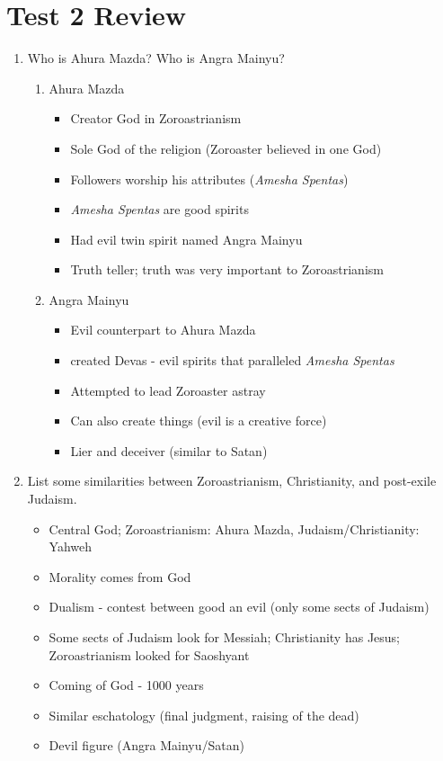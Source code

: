 \documentclass[8pt]{article}
\begin{document}
\section*{Test 2 Review}
\begin{enumerate}
    \item Who is Ahura Mazda? Who is Angra Mainyu?
    \begin{enumerate}
        \item Ahura Mazda
        \begin{itemize}
            \item Creator God in Zoroastrianism
            \item Sole God of the religion (Zoroaster believed in one God)
            \item Followers worship his attributes (\textit{Amesha Spentas})
            \item \textit{Amesha Spentas} are good spirits
            \item Had evil twin spirit named Angra Mainyu
            \item Truth teller; truth was very important to Zoroastrianism
        \end{itemize}
        \item Angra Mainyu
        \begin{itemize}
            \item Evil counterpart to Ahura Mazda
            \item created Devas - evil spirits that paralleled \textit{Amesha Spentas}
            \item Attempted to lead Zoroaster astray
            \item Can also create things (evil is a creative force)
            \item Lier and deceiver (similar to Satan)
        \end{itemize}
    \end{enumerate}

    \item List some similarities between Zoroastrianism, Christianity, and post-exile Judaism.
    \begin{itemize}
        \item Central God; Zoroastrianism: Ahura Mazda, Judaism/Christianity: Yahweh
        \item Morality comes from God
        \item Dualism - contest between good an evil (only some sects of Judaism)
        \item Some sects of Judaism look for Messiah; Christianity has Jesus; Zoroastrianism looked for Saoshyant
        \item Coming of God - 1000 years
        \item Similar eschatology (final judgment, raising of the dead)
        \item Devil figure (Angra Mainyu/Satan)
    \end{itemize}


\end{enumerate}
\end{document}
